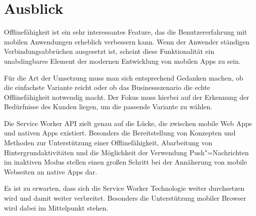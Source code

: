 \chapter{Ausblick}

Offlinefähigkeit ist ein sehr interessantes Feature, das die Benutzererfahrung mit mobilen Anwendungen erheblich verbessern kann. Wenn der Anwender ständigen Verbindungsabbrüchen ausgesetzt ist, scheint diese Funktionalität ein unabdingbares Element der modernen Entwicklung von mobilen Apps zu sein.

Für die Art der Umsetzung muss man sich entsprechend Gedanken machen, ob die einfachste Variante reicht oder ob das Businessszenario die echte Offlinefähigkeit notwendig macht. Der Fokus muss hierbei auf der Erkennung der Bedürfnisse des Kunden liegen, um die passende Variante zu wählen.

Die Service Worker API zielt genau auf die Lücke, die zwischen mobile Web Apps und nativen Apps existiert. Besonders die Bereitstellung von Konzepten und Methoden zur Unterstützung einer Offlinefähigkeit, Abarbeitung von Hintergrundaktivitäten und die Möglichkeit der Verwendung Push"=Nachrichten im inaktiven Modus stellen einen großen Schritt bei der Annäherung von mobile Webseiten an native Apps dar.

Es ist zu erwarten, dass sich die Service Worker Technologie weiter durchsetzen wird und damit weiter verbreitet. Besonders die Unterstützung mobiler Browser wird dabei im Mittelpunkt stehen. 